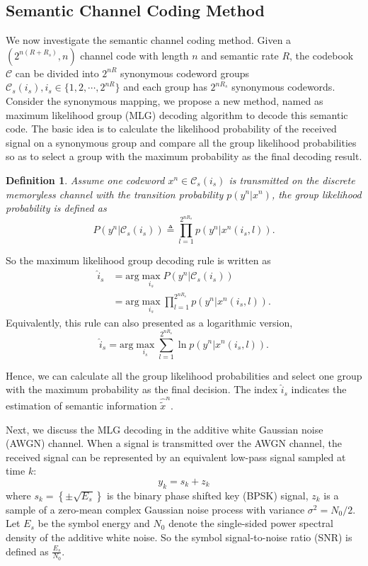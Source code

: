 \documentclass[12pt, draftclsnofoot,onecolumn]{IEEEtran}
\newtheorem{definition}{\bf{Definition}}
\begin{document}
\subsection{Semantic Channel Coding Method}
We now investigate the semantic channel coding method. Given a $\left(2^{n(R+R_s)},n\right)$ channel code with length $n$ and semantic rate $R$, the codebook $\mathcal{C}$ can be divided into $2^{nR}$ synonymous codeword groups $\mathcal{C}_s(i_s), i_s\in \{1,2,\cdots,2^{nR}\}$ and each group has $2^{nR_s}$ synonymous codewords. Consider the synonymous mapping, we propose a new method, named as maximum likelihood group (MLG) decoding algorithm to decode this semantic code. The basic idea is to calculate the likelihood probability of the received signal on a synonymous group and compare all the group likelihood probabilities so as to select a group with the maximum probability as the final decoding result.

\begin{definition}
Assume one codeword $x^n\in \mathcal{C}_s(i_s)$ is transmitted on the discrete memoryless channel with the transition probability $p(y^n|x^n)$, the group likelihood probability is defined as
\begin{equation}
P(y^n|\mathcal{C}_s(i_s))\triangleq \prod_{l=1}^{2^{nR_s}}p(y^n|x^n(i_s,l)).
\end{equation}
\end{definition}

So the maximum likelihood group decoding rule is written as
\begin{equation}
\begin{aligned}
\hat{i}_s &=\text{arg}\max_{i_s} P(y^n|\mathcal{C}_s(i_s)) \\
              &=\text{arg}\max_{i_s} \prod_{l=1}^{2^{nR_s}}p(y^n|x^n(i_s,l)) .
\end{aligned}
\end{equation}
Equivalently, this rule can also presented as a logarithmic version,
\begin{equation}
\hat{i}_s =\text{arg}\max_{i_s} \sum_{l=1}^{2^{nR_s}}\ln p(y^n|x^n(i_s,l)) .
\end{equation}

Hence, we can calculate all the group likelihood probabilities and select one group with the maximum probability as the final decision. The index $\hat{i}_s$ indicates the estimation of semantic information $\hat{\tilde{x}}^n$.

Next, we discuss the MLG decoding in the additive white Gaussian noise (AWGN) channel. When a signal is transmitted over the AWGN channel, the received signal can be represented by an equivalent low-pass signal sampled at time $k$:
\begin{equation}
y_k= s_k+z_k
\end{equation}
where $s_k=\left\{\pm\sqrt{E_s}\right\}$ is the binary phase shifted key (BPSK) signal, $z_k$ is a sample of a zero-mean complex Gaussian noise process with variance $\sigma^2=N_0/2$. Let $E_s$ be the symbol energy and $N_0$ denote the single-sided power spectral density of the additive white noise. So the symbol signal-to-noise ratio (SNR) is defined as $\frac{E_s}{N_0}$.
\end{document}
